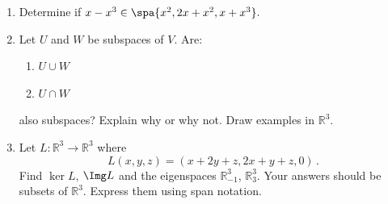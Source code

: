 


\begin{enumerate}


\item \label{subspaces_spanning_sets_polynolmial_span} {Determine} if  
$x-x^3 \in \spa\{ x^2, 2x+x^2, x+x^3 \}.$


\item\label{UandV} \hypertarget{intersections}{Let} $U$ and $W$ be subspaces of $V$.  Are:
\label{UcapV}
\begin{enumerate}
\item $U\cup W$
\item $U\cap W$
\end{enumerate}
also subspaces?  Explain why or why not.  Draw examples in $\mathbb{R}^3$.



\item Let $L:{\mathbb R}^3\to {\mathbb R}^3$ where \[L(x,y,z)=(x+2y+z,2x+y+z,0)\, .\] 
Find $\ker L$, $\Img L$ and the eigenspaces ${\mathbb R}^3_{-1}$, ${\mathbb R}^3_{3}$. Your answers should be subsets of ${\mathbb R}^3$. Express them using span notation.

\end{enumerate}

